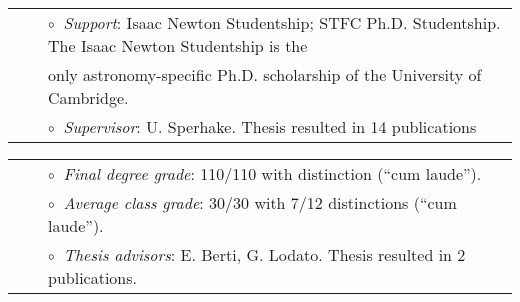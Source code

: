\documentclass[a4paper]{moderncv}
\begin{document}
\vspace{-0.1cm}
\begin{tabular}{rcl}
&\hspace{0.4cm} &$\circ\;\;${\textit{Support}}: Isaac Newton Studentship; STFC Ph.D. Studentship. The
Isaac Newton Studentship is the \\&\hspace{0.4cm} &  
\hspace{0.4cm}only astronomy-specific Ph.D. scholarship of the University of Cambridge.\\
&\hspace{0.4cm} &$\circ\;\;${\textit{Supervisor}}: U. Sperhake. Thesis resulted in 14 publications \\
\end{tabular}

\vspace{0.2cm}
\vspace{-0.1cm}
\begin{tabular}{rcl}
&\hspace{0.4cm} &$\circ\;\;${\textit{Final degree grade}}: 110/110 with distinction (``cum laude'').\\
&\hspace{0.4cm} &$\circ\;\;${\textit{Average class grade}}: 30/30 with 7/12 distinctions (``cum laude'').\\
&\hspace{0.4cm} &$\circ\;\;${\textit{Thesis advisors}}: E. Berti, G. Lodato. Thesis resulted in 2 publications.\\


\end{tabular}
\end{document}
